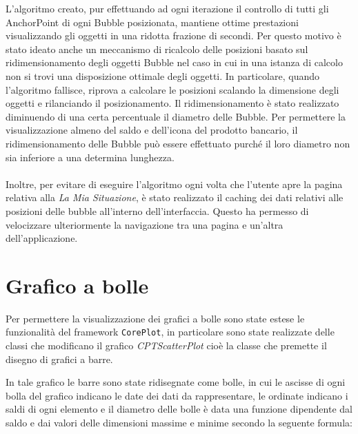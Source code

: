 L'algoritmo creato, pur effettuando ad ogni iterazione il controllo di tutti gli AnchorPoint di ogni Bubble posizionata, mantiene ottime prestazioni visualizzando gli oggetti in una ridotta frazione di secondi. Per questo motivo è stato ideato anche un meccanismo di ricalcolo delle posizioni basato sul ridimensionamento degli oggetti Bubble nel caso in cui in una istanza di calcolo non si trovi una disposizione ottimale degli oggetti.  
In particolare, quando l'algoritmo fallisce, riprova a calcolare le posizioni scalando la dimensione degli oggetti e rilanciando il posizionamento. Il ridimensionamento è stato realizzato diminuendo di una certa percentuale il diametro delle Bubble. Per permettere la visualizzazione almeno del saldo e dell'icona del prodotto bancario, il ridimensionamento delle Bubble può essere effettuato purché il loro diametro non sia inferiore a una determina lunghezza.
\\\\
Inoltre, per evitare di eseguire l'algoritmo ogni volta che l'utente apre la pagina relativa alla \emph{La Mia Situazione}, è stato realizzato il caching dei dati relativi alle posizioni delle bubble all'interno dell'interfaccia. Questo ha permesso di velocizzare ulteriormente la navigazione tra una pagina e un'altra dell'applicazione.

\section{Grafico a bolle}

Per permettere la visualizzazione dei grafici a bolle sono state estese le funzionalità del framework \texttt{CorePlot}, in particolare sono state realizzate delle classi che modificano il grafico \emph{CPTScatterPlot} cioè la classe che premette il disegno di grafici a barre.

In tale grafico le barre sono state ridisegnate come bolle, in cui le ascisse di ogni bolla del grafico indicano le date dei dati da rappresentare, le ordinate indicano i saldi di ogni elemento e il diametro delle bolle è data una funzione dipendente dal saldo e dai valori delle dimensioni massime e minime secondo la seguente formula:




% 

